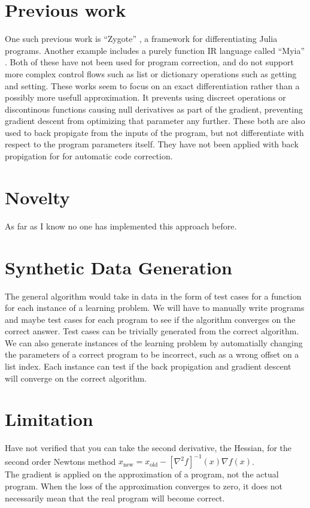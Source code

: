 \documentclass{article}
\begin{document}
\section*{Previous work}
One such previous work is ``Zygote'' \cite{DBLP:journals/corr/abs-1907-07587}, a framework for differentiating Julia programs. Another example includes a purely function IR language called ``Myia'' \cite{DBLP:journals/corr/abs-1810-11530}. Both of these have not been used for program correction, and do not support more complex control flows such as list or dictionary operations such as getting and setting. These works seem to focus on an exact differentiation rather than a possibly more usefull approximation. It prevents using discreet operations or discontinous functions causing null derivatives as part of the gradient, preventing gradient descent from optimizing that parameter any further. These both are also used to back propigate from the inputs of the program, but not differentiate with respect to the program parameters itself. They have not been applied with back propigation for for automatic code correction.
\section*{Novelty}
As far as I know no one has implemented this approach before.
\section*{Synthetic Data Generation}
The general algorithm would take in data in the form of test cases for a function for each instance of a learning problem. We will have to manually write programs and maybe test cases for each program to see if the algorithm converges on the correct answer. Test cases can be trivially generated from the correct algorithm. We can also generate instances of the learning problem by automatially changing the parameters of a correct program to be incorrect, such as a wrong offset on a list index. Each instance can test if the back propigation and gradient descent will converge on the correct algorithm.
\section*{Limitation}
Have not verified that you can take the second derivative, the Hessian, for the second order Newtons method $x_{\mathrm{new}} = x_{\mathrm{old}} - [\nabla^2 f]^{-1}(x) \nabla f(x)$.\\
The gradient is applied on the approximation of a program, not the actual program. When the loss of the approximation converges to zero, it does not necessarily mean that the real program will become correct.


\end{document}
